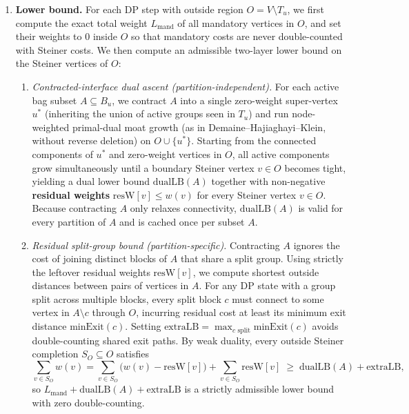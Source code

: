 \documentclass[11pt]{article}
\theoremstyle{definition}
\theoremstyle{remark}
\begin{document}
\begin{enumerate}
    \item[$\bullet$] \textbf{Lower bound.} For each DP step with outside region $O = V \setminus T_u$, we first compute the exact total weight $L_{\mathrm{mand}}$ of all mandatory vertices in $O$, and set their weights to $0$ inside $O$ so that mandatory costs are never double-counted with Steiner costs. We then compute an admissible two-layer lower bound on the Steiner vertices of $O$:
    \begin{enumerate}
        \item \emph{Contracted-interface dual ascent (partition-independent).} For each active bag subset $A \subseteq B_u$, we contract $A$ into a single zero-weight super-vertex $u^*$ (inheriting the union of active groups seen in $T_u$) and run node-weighted primal-dual moat growth (as in Demaine--Hajiaghayi--Klein, without reverse deletion) on $O \cup \{u^*\}$. Starting from the connected components of $u^*$ and zero-weight vertices in $O$, all active components grow simultaneously until a boundary Steiner vertex $v \in O$ becomes tight, yielding a dual lower bound $\mathrm{dualLB}(A)$ together with non-negative \textbf{residual weights} $\mathrm{resW}[v] \le w(v)$ for every Steiner vertex $v \in O$. Because contracting $A$ only relaxes connectivity, $\mathrm{dualLB}(A)$ is valid for every partition of $A$ and is cached once per subset $A$.
        \item \emph{Residual split-group bound (partition-specific).} Contracting $A$ ignores the cost of joining distinct blocks of $A$ that share a split group. Using strictly the leftover residual weights $\mathrm{resW}[v]$, we compute shortest outside distances between pairs of vertices in $A$. For any DP state with a group split across multiple blocks, every split block $c$ must connect to some vertex in $A \setminus c$ through $O$, incurring residual cost at least its minimum exit distance $\mathrm{minExit}(c)$. Setting $\mathrm{extraLB} = \max_{c \text{ split}} \mathrm{minExit}(c)$ avoids double-counting shared exit paths. By weak duality, every outside Steiner completion $S_O \subseteq O$ satisfies
        \[
            \sum_{v \in S_O} w(v) = \sum_{v \in S_O}\bigl(w(v) - \mathrm{resW}[v]\bigr) + \sum_{v \in S_O} \mathrm{resW}[v] \;\ge\; \mathrm{dualLB}(A) + \mathrm{extraLB},
        \]
        so $L_{\mathrm{mand}} + \mathrm{dualLB}(A) + \mathrm{extraLB}$ is a strictly admissible lower bound with zero double-counting.
    \end{enumerate}


\end{enumerate}
\end{document}
